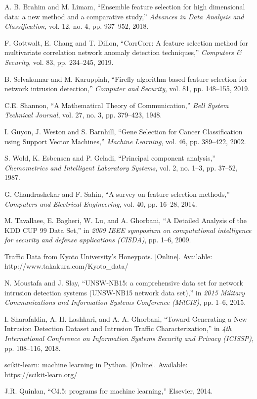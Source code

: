 \documentclass{ieeeaccess}
\theoremstyle{definition}
\begin{document}
\begin{thebibliography}{00}
    A. B. Brahim and M. Limam, ``Ensemble feature selection for high dimensional data: a new method and a comparative study,'' \emph{Advances in Data Analysis and Classification}, vol. 12, no. 4, pp. 937--952, 2018.

    F. Gottwalt, E. Chang and T. Dillon, ``CorrCorr: A feature selection method for multivariate correlation network anomaly detection techniques,'' \emph{Computers \& Security}, vol. 83, pp. 234--245, 2019.

    B. Selvakumar and M. Karuppiah, ``Firefly algorithm based feature selection for network intrusion detection,'' \emph{Computer and Security}, vol. 81, pp. 148--155, 2019.

    C.E. Shannon, ``A Mathematical Theory of Communication,'' \emph{Bell System Technical Journal}, vol. 27, no. 3, pp. 379--423, 1948.

    I. Guyon, J. Weston and S. Barnhill, ``Gene Selection for Cancer Classification using Support Vector Machines,'' \emph{Machine Learning}, vol. 46, pp. 389--422, 2002.

    S. Wold, K. Esbensen and P. Geladi, ``Principal component analysis,'' \emph{Chemometrics and Intelligent Laboratory Systems}, vol. 2, no. 1--3, pp. 37--52, 1987.

    G. Chandrashekar and F. Sahin, ``A survey on feature selection methods,'' \emph{Computers and Electrical Engineering}, vol. 40, pp. 16--28, 2014.

    M. Tavallaee, E. Bagheri, W. Lu, and A. Ghorbani, ``A Detailed Analysis of the KDD CUP 99 Data Set,'' in \emph{2009 IEEE symposium on computational intelligence for security and defense applications (CISDA)}, pp. 1--6, 2009.

    Traffic Data from Kyoto University's Honeypots. [Online]. Available: \\ http://www.takakura.com/Kyoto\_data/

    N. Moustafa and J. Slay, ``UNSW-NB15: a comprehensive data set for network intrusion detection systems (UNSW-NB15 network data set),'' in \emph{2015 Military Communications and Information Systems Conference (MilCIS)}, pp. 1--6, 2015.

    I. Sharafaldin, A. H. Lashkari, and A. A. Ghorbani, ``Toward Generating a New Intrusion Detection Dataset and Intrusion Traffic Characterization,'' in \emph{4th International Conference on Information Systems Security and Privacy (ICISSP)}, pp. 108--116, 2018.

    scikit-learn: machine learning in Python. [Online]. Available: \\ https://scikit-learn.org/

    J.R. Quinlan, ``C4.5: programs for machine learning,'' Elsevier, 2014.
\end{thebibliography}
\end{document}
